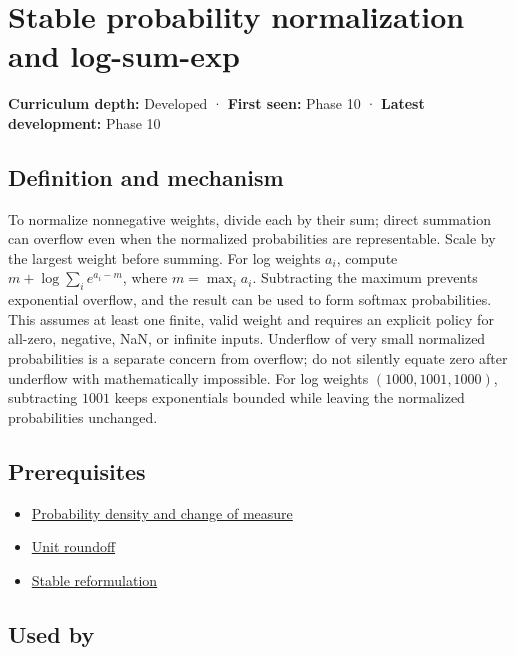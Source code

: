 \hypertarget{appendix-d580b422240f}{}\label{referencestart:appendix-d580b422240f}
\section{Stable probability normalization and log-sum-exp}\label{appendix-d580b422240f-stable-probability-normalization-and-log-sum-exp}

\textbf{Curriculum depth:} Developed · \textbf{First seen:} Phase 10 · \textbf{Latest development:} Phase 10

\subsection{Definition and mechanism}\label{appendix-d580b422240f-definition-and-mechanism}

To normalize nonnegative weights, divide each by their sum; direct summation can overflow even when the normalized probabilities are representable. Scale by the largest weight before summing. For log weights \(a_i\), compute \(m+\log\sum_i e^{a_i-m}\), where \(m=\max_i a_i\). Subtracting the maximum prevents exponential overflow, and the result can be used to form softmax probabilities. This assumes at least one finite, valid weight and requires an explicit policy for all-zero, negative, NaN, or infinite inputs. Underflow of very small normalized probabilities is a separate concern from overflow; do not silently equate zero after underflow with mathematically impossible. For log weights \((1000,1001,1000)\), subtracting \(1001\) keeps exponentials bounded while leaving the normalized probabilities unchanged.

\subsection{Prerequisites}\label{appendix-d580b422240f-prerequisites}

\begin{itemize}
\tightlist
\item
  \hyperref[appendix-4815cd87ab8b]{Probability density and change of measure}
\item
  \hyperref[appendix-bc44f7b42f42]{Unit roundoff}
\item
  \hyperref[appendix-d7f8ba961670]{Stable reformulation}
\end{itemize}

\subsection{Used by}\label{appendix-d580b422240f-used-by}

